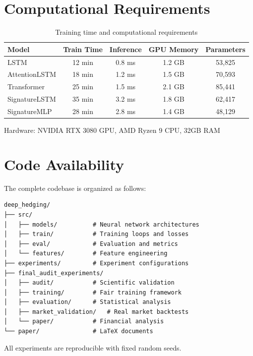 \section{Computational Requirements}
\label{app:compute}

\begin{table}[h]
\centering
\caption{Training time and computational requirements}
\begin{tabular}{lcccc}
\toprule
\textbf{Model} & \textbf{Train Time} & \textbf{Inference} & \textbf{GPU Memory} & \textbf{Parameters} \\
\midrule
LSTM & 12 min & 0.8 ms & 1.2 GB & 53,825 \\
AttentionLSTM & 18 min & 1.2 ms & 1.5 GB & 70,593 \\
Transformer & 25 min & 1.5 ms & 2.1 GB & 85,441 \\
SignatureLSTM & 35 min & 3.2 ms & 1.8 GB & 62,417 \\
SignatureMLP & 28 min & 2.8 ms & 1.4 GB & 48,129 \\
\bottomrule
\end{tabular}
\footnotesize{Hardware: NVIDIA RTX 3080 GPU, AMD Ryzen 9 CPU, 32GB RAM}
\end{table}

\section{Code Availability}
\label{app:code}

The complete codebase is organized as follows:

\begin{verbatim}
deep_hedging/
├── src/
│   ├── models/          # Neural network architectures
│   ├── train/           # Training loops and losses
│   ├── eval/            # Evaluation and metrics
│   └── features/        # Feature engineering
├── experiments/         # Experiment configurations
├── final_audit_experiments/
│   ├── audit/           # Scientific validation
│   ├── training/        # Fair training framework
│   ├── evaluation/      # Statistical analysis
│   ├── market_validation/   # Real market backtests
│   └── paper/           # Financial analysis
└── paper/               # LaTeX documents
\end{verbatim}

All experiments are reproducible with fixed random seeds.

